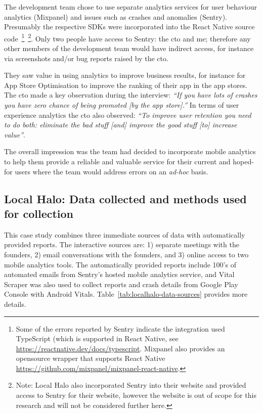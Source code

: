 The development team chose to use separate analytics services for user behaviour analytics (Mixpanel) and issues such as crashes and anomalies (Sentry). Presumably the respective SDKs were incorporated into the React Native source code~\footnote{Some of the errors reported by Sentry indicate the integration used TypeScript (which is supported in React Native, see \url{https://reactnative.dev/docs/typescript}. Mixpanel also provides an opensource wrapper that supports React Native \url{https://github.com/mixpanel/mixpanel-react-native}.}~\footnote{Note: Local Halo also incorporated Sentry into their website and provided access to Sentry for their website, however the website is out of scope for this research and will not be considered further here.}. Only two people have access to Sentry: the \acrshort{cto} and me; therefore any other members of the development team would have indirect access, for instance via screenshots and/or bug reports raised by the \acrshort{cto}. 

They saw value in using analytics to improve business results, for instance for App Store Optimisation to improve the ranking of their app in the app stores. The \acrshort{cto} made a key observation during the interview: \emph{``If you have lots of crashes you have zero chance of being promoted [by the app store].''}
%
In terms of user experience analytics the \acrshort{cto} also observed: \emph{``To improve user retention you need to do both: eliminate the bad stuff [and] improve the good stuff [to] increase value''}.

The overall impression was the team had decided to incorporate mobile analytics to help them provide a reliable and valuable service for their current and hoped-for users where the team would address errors on an \emph{ad-hoc} basis.


\subsection{Local Halo: Data collected and methods used for collection}
This case study combines three immediate sources of data with automatically provided reports. The interactive sources are: 1) separate meetings with the founders, 2) email conversations with the founders, and 3) online access to two mobile analytics tools. The automatically provided reports include 100's of automated emails from Sentry's hosted mobile analytics service, and Vital Scraper was also used to collect reports and crash details from Google Play Console with Android Vitals. Table~\ref{tab:localhalo-data-sources} provides more details.

